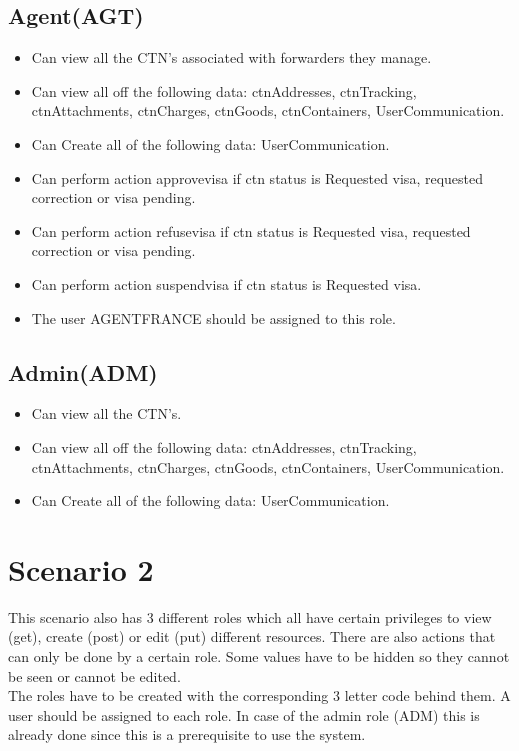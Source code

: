 \subsection{Agent(AGT)}
\begin{itemize}
    \item Can view all the CTN's associated with forwarders they manage.
    \item Can view all off the following data: ctnAddresses, ctnTracking, ctnAttachments, ctnCharges, ctnGoods, ctnContainers, UserCommunication.
    \item Can Create all of the following data: UserCommunication.
    \item Can perform action approvevisa if ctn status is Requested visa, requested correction or visa pending.
     \item Can perform action refusevisa if ctn status is Requested visa, requested correction or visa pending.
     \item Can perform action suspendvisa if ctn status is Requested visa.
     \item The user AGENTFRANCE should be assigned to this role.
\end{itemize}

\subsection{Admin(ADM)}
\begin{itemize}
    \item Can view all the CTN's.
    \item Can view all off the following data: ctnAddresses, ctnTracking, ctnAttachments, ctnCharges, ctnGoods, ctnContainers, UserCommunication.
     \item Can Create all of the following data: UserCommunication.    
\end{itemize}

\section{Scenario 2}
This scenario also has 3 different roles which all have certain privileges to view (get), create (post) or edit (put) different resources.
There are also actions that can only be done by a certain role.
Some values have to be hidden so they cannot be seen or cannot be edited.
\\
The roles have to be created with the corresponding 3 letter code behind them. A user should be assigned to each role. In case of the admin role (ADM) this is already done since this is a prerequisite to use the system.

